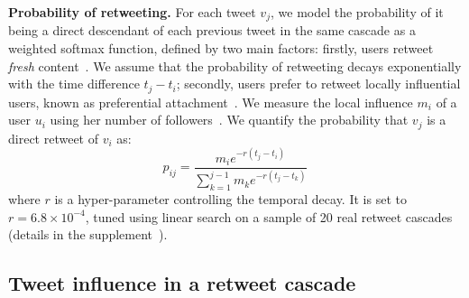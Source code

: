 \noindent\textbf{Probability of retweeting.}
For each tweet $v_j$, we model the probability of it being a direct descendant of each previous tweet in the same cascade as a weighted softmax function, defined by two main factors:
firstly, users retweet \emph{fresh} content~\cite{Wu2007}.
We assume that the probability of retweeting decays exponentially with the time difference $t_j - t_i$;
secondly, users prefer to retweet locally influential users, known as preferential attachment~\cite{Barabasi2005,Rizoiu2017}.
We measure the local influence $m_i$ of a user $u_i$ using her number of followers~\cite{kwak2010twitter,Cha2010}.
We quantify the probability that $v_j$ is a direct retweet of $v_i$ as:
\begin{equation} \label{eq:prob-edge-mt}
	p_{ij} = \frac{m_i e^{-r({t_j-t_i})}}{\sum_{k=1}^{j-1} m_k e^{-r({t_j-t_k})}}
\end{equation}
where 
$r$ is a hyper-parameter controlling the temporal decay. 
It is set to $r = 6.8 \times 10^{-4}$, tuned using linear search on a sample of 20 real retweet cascades (details in the supplement~\cite[annex~D]{supplemental}).

\subsection{Tweet influence in a retweet cascade}
\label{subsec:user-influence-mt}

